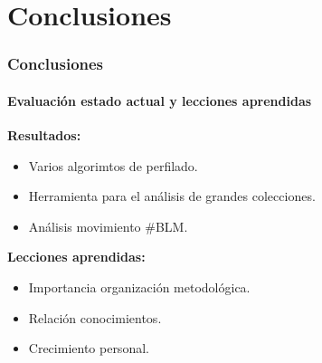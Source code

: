 \documentclass{beamer}
\begin{document}
\section{Conclusiones}

	\begin{frame}
			\frametitle{Conclusiones}
			\framesubtitle{Evaluación estado actual y lecciones aprendidas}
			\vspace{0cm}
			\textbf{Resultados:}
			\begin{itemize}
				\item Varios algorimtos de perfilado.\pause
				\item Herramienta para el análisis de grandes colecciones.\pause
				\item Análisis movimiento \#BLM. 

			\end{itemize} 
			\pause
			\vspace{0.5cm}
			\textbf{Lecciones aprendidas:}  \pause
			\begin{itemize}
				\item Importancia organización metodológica. \pause
				\item Relación conocimientos. \pause
				\item Crecimiento personal.
			\end{itemize}
	\end{frame}
	
\end{document}
